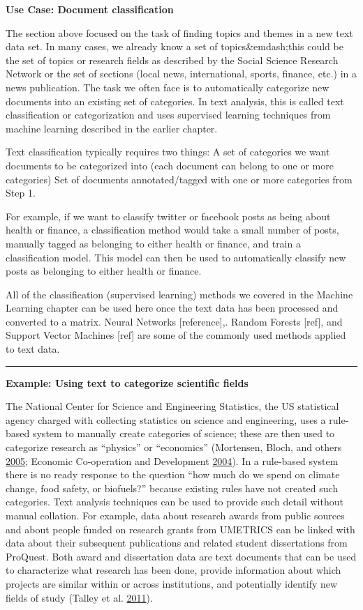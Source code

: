 \documentclass[]{krantz}
\begin{document}
\textbf{Use Case: Document classification}

The section above focused on the task of finding topics and themes in a
new text data set. In many cases, we already know a set of
topics\&emdash;this could be the set of topics or research fields as
described by the Social Science Research Network or the set of sections
(local news, international, sports, finance, etc.) in a news
publication. The task we often face is to automatically categorize new
documents into an existing set of categories. In text analysis, this is
called text classification or categorization and uses supervised
learning techniques from machine learning described in the earlier
chapter.

Text classification typically requires two things: A set of categories
we want documents to be categorized into (each document can belong to
one or more categories) Set of documents annotated/tagged with one or
more categories from Step 1.

For example, if we want to classify twitter or facebook posts as being
about health or finance, a classification method would take a small
number of posts, manually tagged as belonging to either health or
finance, and train a classification model. This model can then be used
to automatically classify new posts as belonging to either health or
finance.

All of the classification (supervised learning) methods we covered in
the Machine Learning chapter can be used here once the text data has
been processed and converted to a matrix. Neural Networks
{[}reference{]},. Random Forests {[}ref{]}, and Support Vector Machines
{[}ref{]} are some of the commonly used methods applied to text data.

\begin{center}\rule{0.5\linewidth}{\linethickness}\end{center}

\textbf{Example: Using text to categorize scientific fields}

The National Center for Science and Engineering Statistics, the US
statistical agency charged with collecting statistics on science and
engineering, uses a rule-based system to manually create categories of
science; these are then used to categorize research as ``physics'' or
``economics'' (Mortensen, Bloch, and others
\protect\hyperlink{ref-oecd2005measurement}{2005}; Economic Co-operation
and Development \protect\hyperlink{ref-manual2004summary}{2004}). In a
rule-based system there is no ready response to the question ``how much
do we spend on climate change, food safety, or biofuels?'' because
existing rules have not created such categories. Text analysis
techniques can be used to provide such detail without manual collation.
For example, data about research awards from public sources and about
people funded on research grants from UMETRICS can be linked with data
about their subsequent publications and related student dissertations
from ProQuest. Both award and dissertation data are text documents that
can be used to characterize what research has been done, provide
information about which projects are similar within or across
institutions, and potentially identify new fields of study (Talley et
al. \protect\hyperlink{ref-talley2011database}{2011}).
\end{document}
